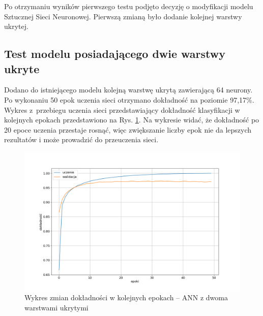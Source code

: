 Po otrzymaniu wyników pierwszego testu podjęto decyzję o modyfikacji modelu Sztucznej Sieci 
Neuronowej. Pierwszą zmianą było dodanie kolejnej warstwy ukrytej.

\subsection{Test modelu posiadającego dwie warstwy ukryte}

Dodano do istniejącego modelu kolejną warstwę ukrytą zawierającą 64 neurony. Po wykonaniu 50 epok uczenia 
sieci otrzymano dokładność na poziomie 97,17\%. Wykres z~przebiegu uczenia sieci przedstawiający dokładność 
klasyfikacji w kolejnych epokach przedstawiono na Rys. \ref{keras-accuracy2}. Na wykresie widać, że dokładność
po 20 epoce uczenia przestaje rosnąć, więc zwiększanie liczby epok nie da lepszych rezultatów i może prowadzić do 
przeuczenia sieci.   

\begin{figure}
    \centering
    \includegraphics[width=\textwidth]{img/keras-accuracy2.png}
    \caption{Wykres zmian dokładności w kolejnych epokach -- ANN z dwoma warstwami ukrytymi}
    \label{keras-accuracy2}
\end{figure}


